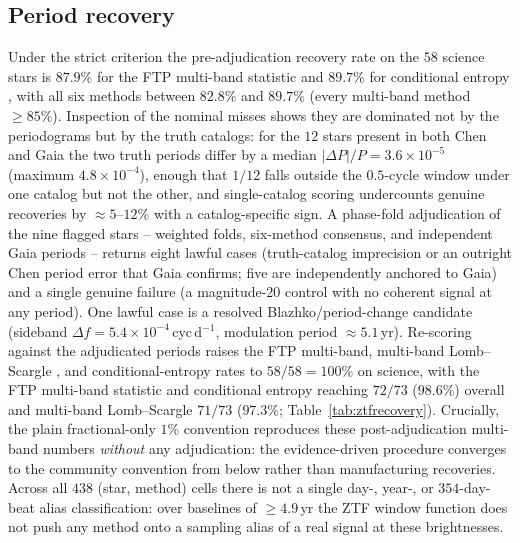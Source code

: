 \documentclass[apj]{emulateapj}
\begin{document}
\subsection{Period recovery}
\label{sec:ztfdemo-recovery}

Under the strict criterion the pre-adjudication recovery rate on the $58$
science stars is $87.9\%$ for the FTP multi-band statistic and $89.7\%$ for
conditional entropy \citep{Graham_etal_2013b}, with all six methods between
$82.8\%$ and $89.7\%$ (every multi-band method $\geq85\%$).  Inspection of the
nominal misses shows they are dominated not by the periodograms but by the
truth catalogs: for the $12$ stars present in both Chen and Gaia the two truth
periods differ by a median $|\Delta P|/P = 3.6\times10^{-5}$ (maximum
$4.8\times10^{-4}$), enough that $1/12$ falls outside the $0.5$-cycle window
under one catalog but not the other, and single-catalog scoring undercounts
genuine recoveries by ${\approx}5$--$12\%$ with a catalog-specific sign.  A
phase-fold adjudication of the nine flagged stars -- weighted folds, six-method
consensus, and independent Gaia periods -- returns eight lawful cases
(truth-catalog imprecision or an outright Chen period error that Gaia
confirms; five are independently anchored to Gaia) and a single genuine
failure (a magnitude-$20$ control with no coherent signal at any period).  One
lawful case is a resolved Blazhko/period-change candidate
(sideband $\Delta f = 5.4\times10^{-4}$\,cyc\,d$^{-1}$, modulation period
${\approx}5.1$\,yr).  Re-scoring against the adjudicated periods raises the FTP
multi-band, multi-band Lomb--Scargle \citep{Vanderplas+Ivezic_2015}, and
conditional-entropy rates to $58/58 = 100\%$ on science, with the FTP
multi-band statistic and conditional entropy reaching $72/73$ ($98.6\%$)
overall and multi-band Lomb--Scargle $71/73$ ($97.3\%$;
Table~\ref{tab:ztfrecovery}).  Crucially, the plain fractional-only $1\%$
convention reproduces these post-adjudication multi-band numbers \emph{without}
any adjudication: the evidence-driven procedure converges to the community
convention from below rather than manufacturing recoveries.  Across all $438$
(star, method) cells there is not a single day-, year-, or $354$-day-beat
alias classification: over baselines of ${\geq}4.9$\,yr the ZTF
window function does not push any method onto a sampling alias of a real
signal at these brightnesses.
\end{document}

